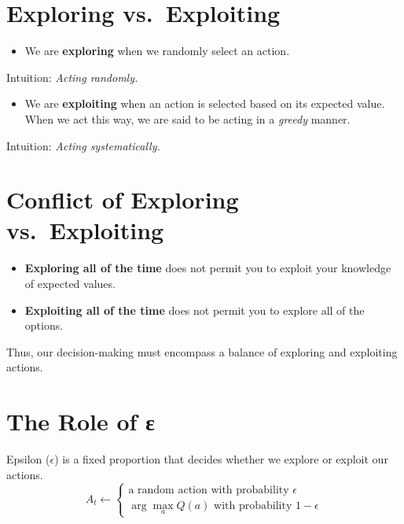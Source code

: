 \documentclass[
  letterpaper,
  DIV=11,
  numbers=noendperiod]{scrreprt}
\providecommand{\tightlist}{%
  \setlength{\itemsep}{0pt}\setlength{\parskip}{0pt}}\usepackage{longtable,booktabs,array}
\begin{document}
\section{Exploring vs.~Exploiting}\label{exploring-vs.-exploiting}

\begin{itemize}
\tightlist
\item
  We are \textbf{exploring} when we randomly select an action.
\end{itemize}

Intuition: \emph{Acting randomly.}

\begin{itemize}
\tightlist
\item
  We are \textbf{exploiting} when an action is selected based on its
  expected value. When we act this way, we are said to be acting in a
  \emph{greedy} manner.
\end{itemize}

Intuition: \emph{Acting systematically.}

\section{Conflict of Exploring
vs.~Exploiting}\label{conflict-of-exploring-vs.-exploiting}

\begin{itemize}
\item
  \textbf{Exploring all of the time} does not permit you to exploit your
  knowledge of expected values.
\item
  \textbf{Exploiting all of the time} does not permit you to explore all
  of the options.
\end{itemize}

Thus, our decision-making must encompass a balance of exploring and
exploiting actions.

\section{The Role of ε}\label{the-role-of-ux3b5}

Epsilon (\(\epsilon\)) is a fixed proportion that decides whether we
explore or exploit our actions. \[
  A_t \gets 
  \begin{cases}
      \text{a random action with probability } \epsilon \\
      \arg\max_a Q(a) \text{ with probability } 1 - \epsilon
  \end{cases}
\]
\end{document}
